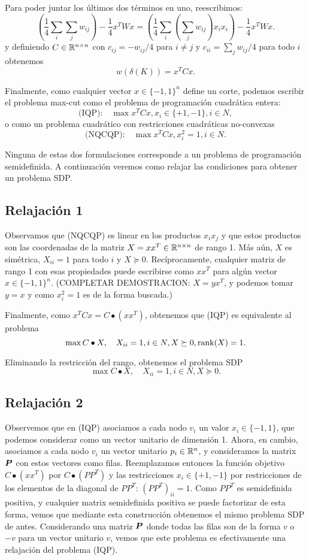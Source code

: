 Para poder juntar los últimos dos términos en uno, reescribimos:
$$
\left(\frac{1}{4}\sum_i \sum_j w_{ij} \right) - \frac{1}{4} x^T W x = \left(\frac{1}{4}\sum_i \left(\sum_j w_{ij}\right) x_i x_i \right) - \frac{1}{4} x^T W x.
$$
y definiendo $C \in \mathbb{R}^{n \times n}$ con $c_{ij} = -w_{ij}/4$ para $i \neq j$ y $c_{ii} = \sum_j w_{ij}/4$ para todo $i$ obtenemos
$$
w(\delta(K)) = x^T C x.
$$

Finalmente, como cualquier vector $x \in \{-1, 1\}^n$ define un corte, podemos escribir el problema max-cut como el problema de programación cuadrática entera:
$$
\text{(IQP):} \quad \max x^TCx, x_i \in \{+1, -1\}, i \in N,
$$
o como un problema cuadrático con restricciones cuadráticas no-convexas
$$
\text{(NQCQP):} \quad \max x^TCx, x_i^2 = 1, i \in N.
$$

Ninguna de estas dos formulaciones corresponde a un problema de programación semidefinida. A continuación veremos como relajar las condiciones para obtener un problema SDP.

\subsection{Relajación 1}
Observamos que (NQCQP) es linear en los productos $x_i x_j$ y que estos productos son las coordenadas de la matriz $X = xx^T \in \mathbb{R}^{n \times n}$ de rango 1. Más aún, $X$ es simétrica, $X_{ii} = 1$ para todo $i$ y $X \succeq 0$. Recíprocamente, cualquier matriz de rango 1 con esas propiedades puede escribirse como $xx^T$ para algún vector $x \in \{-1, 1\}^n$. (COMPLETAR DEMOSTRACION: $X = y x^T$, y podemos tomar $y = x$ y como $x_i^2 = 1$ es de la forma buscada.)

Finalmente, como $x^T C x = C \bullet (xx^T)$, obtenemos que (IQP) es equivalente al problema
$$
\max C \bullet X, \quad X_{ii} = 1, i \in N, X \succeq 0, \operatorname{rank}(X) = 1.
$$

Eliminando la restricción del rango, obtenemos el problema SDP
$$
\max C \bullet X, \quad X_{ii} = 1, i \in N, X \succeq 0.
$$

\subsection{Relajación 2}

Observemos que en (IQP) asociamos a cada nodo $v_i$ un valor $x_i \in \{-1, 1\}$, que podemos considerar como un vector unitario de dimensión 1.
Ahora, en cambio, asociamos a cada nodo $v_i$ un vector unitario $p_i \in \mathbb{R}^n$, y consideramos la matrix $\bm{P}$ con estos vectores como filas. Reemplazamos entonces la función objetivo $C\bullet (xx^T)$ por $C \bullet (PP^T)$ y las restricciones $x_i \in \{+1, -1\}$ por restricciones de los elementos de la diagonal de $PP^T$: $(PP^T)_{ii} = 1$. Como $PP^T$ es  semidefinida positiva, y cualquier matrix semidefinida positiva se puede factorizar de esta forma, vemos que mediante esta construcción obtenemos el mismo problema SDP de antes.
Considerando una matriz $\bm{P}$ donde todas las filas son de la forma $v$ o $-v$ para un vector unitario $v$, vemos que este problema es efectivamente una relajación del problema (IQP).

